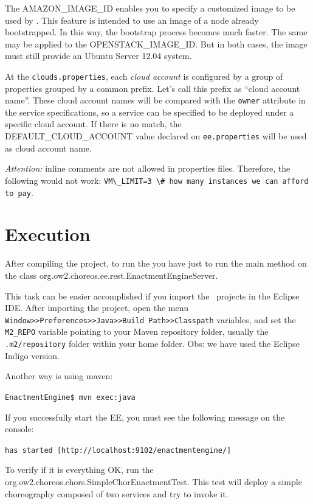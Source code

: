 The AMAZON\_IMAGE\_ID enables you to specify a customized image to be used by \ee. This feature is intended to use an image of a node already bootstrapped. In this way, the bootstrap process becomes much faster. The same may be applied to the OPENSTACK\_IMAGE\_ID. But in both cases, the image must still provide an Ubuntu Server 12.04 system.

At the \texttt{clouds.properties}, each \emph{cloud account} is configured by a group of properties grouped by a common prefix. Let's call this prefix as ``cloud account name''. These cloud account names will be compared with the \texttt{owner} attribute in the service specifications, so a service can be specified to be deployed under a specific cloud account. If there is no match, the DEFAULT\_CLOUD\_ACCOUNT value declared on \texttt{ee.properties} will be used as cloud account name.

\emph{Attention:} inline comments are not allowed in properties files. Therefore, the following would not work: \verb!VM\_LIMIT=3 \# how many instances we can afford to pay!.

\section{Execution}

After compiling the project, to run the \ee you have just to run the main method on the class \textsf{org.ow2.choreos.ee.rest.EnactmentEngineServer}.

This task can be easier accomplished if you import the \ee\ projects in the Eclipse IDE. After importing the project, open the menu \texttt{Window>>Preferences>>Java>>Build Path>>Classpath} variables, and set the \texttt{M2\_REPO} variable pointing to your Maven repository folder, usually the \texttt{.m2/repository} folder within your home folder. Obs: we have used the Eclipse Indigo version.

Another way is using maven:

\texttt{EnactmentEngine\$ mvn exec:java}

If you successfully start the EE, you must see the following message on the console: 

\texttt{\ee has started [http://localhost:9102/enactmentengine/]}

To verify if it is everything OK, run the \textsf{org.ow2.choreos.chors.SimpleChorEnactmentTest}. This test will deploy a simple choreography composed of two services and try to invoke it.



